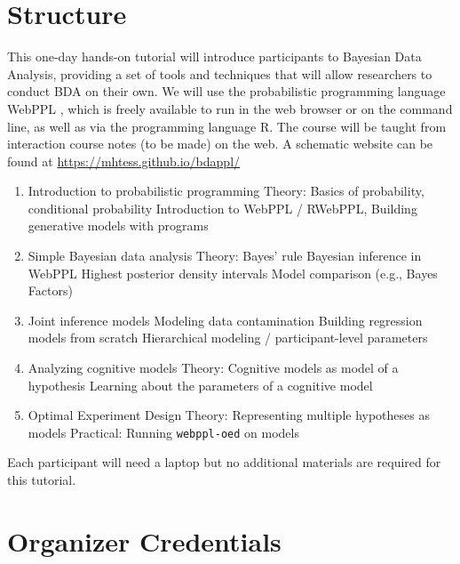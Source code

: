 \documentclass[10pt,letterpaper]{article}
\providecommand{\tightlist}{%
  \setlength{\itemsep}{0pt}\setlength{\parskip}{0pt}}
\begin{document}
\section{Structure}

This one-day hands-on tutorial will introduce participants to Bayesian Data Analysis, providing a set of tools and techniques that will allow researchers to conduct BDA on their own. 
We will use the probabilistic programming language WebPPL \cite{dippl}, which is freely available to run in the web browser or on the command line, as well as via the programming language R.  
The course will be taught from interaction course notes (to be made) on the web. 
A schematic website can be found at \url{https://mhtess.github.io/bdappl/}

\begin{enumerate}
\tightlist
\item Introduction to probabilistic programming
	\subitem Theory: Basics of probability, conditional probability
	\subitem Introduction to WebPPL / RWebPPL, 
	\subitem Building generative models with programs
\item Simple Bayesian data analysis
	\subitem Theory: Bayes' rule
	\subitem Bayesian inference in WebPPL
	\subitem Highest posterior density intervals
	\subitem Model comparison (e.g., Bayes Factors)
\item Joint inference models
	\subitem Modeling data contamination
	\subitem Building regression models from scratch 
	\subitem Hierarchical modeling  / participant-level parameters
\item Analyzing cognitive models
	\subitem Theory: Cognitive models as model of a hypothesis
	\subitem Learning about the parameters of a cognitive model
\item Optimal Experiment Design
	\subitem Theory: Representing multiple hypotheses as models 
	\subitem Practical: Running \texttt{webppl-oed} on models
\end{enumerate}

Each participant will need a laptop but no additional materials are required for this tutorial. 

\section{Organizer Credentials}
\end{document}
